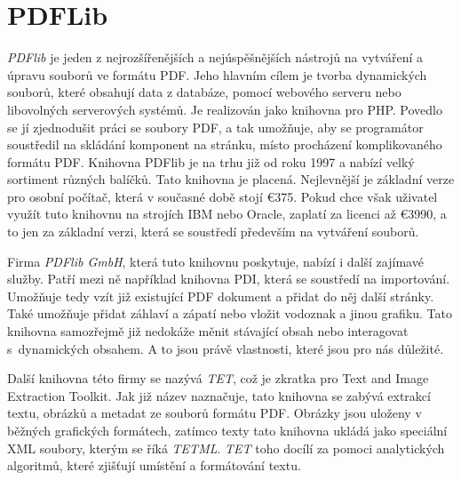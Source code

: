 \documentclass[czech,BP]{thesiskiv}
\begin{document}
\section{PDFLib}
\emph{PDFlib} je jeden z nejrozšířenějších a nejúspěšnějších nástrojů na vytváření a úpravu souborů ve formátu PDF. Jeho hlavním cílem je tvorba dynamických souborů, které obsahují data z databáze, pomocí webového serveru nebo libovolných serverových systémů. Je realizován jako knihovna pro PHP. Povedlo se jí zjednodušit práci se soubory PDF, a tak umožňuje, aby se programátor soustředil na skládání komponent na stránku, místo procházení komplikovaného formátu PDF. Knihovna PDFlib je na trhu již od roku 1997 a nabízí velký sortiment různých balíčků. Tato knihovna je placená. Nejlevnější je základní verze pro osobní počítač, která v současné době stojí \euro 375. Pokud chce však uživatel využít tuto knihovnu na strojích IBM nebo Oracle, zaplatí za licenci až \euro 3990, a to jen za základní verzi, která se soustředí především na vytváření souborů. 

Firma \emph{PDFlib GmbH}, která tuto knihovnu poskytuje, nabízí i další zajímavé služby. Patří mezi ně například knihovna PDI, která se soustředí na importování. Umožňuje tedy vzít již existující PDF dokument a přidat do něj další stránky. Také umožňuje přidat záhlaví a zápatí nebo vložit vodoznak a jinou grafiku. Tato knihovna samozřejmě již nedokáže měnit stávající obsah nebo interagovat s~dynamických obsahem. A to jsou právě vlastnosti, které jsou pro nás důležité. 

Další knihovna této firmy se nazývá \emph{TET}, což je zkratka pro Text and Image Extraction Toolkit. Jak již název naznačuje, tato knihovna se zabývá extrakcí textu, obrázků a metadat ze souborů formátu PDF. Obrázky jsou uloženy v běžných grafických formátech, zatímco texty tato knihovna ukládá jako speciální XML soubory, kterým se říká \emph{TETML}. \emph{TET} toho docílí za pomoci analytických algoritmů, které zjišťují umístění a formátování textu. 
\end{document}

